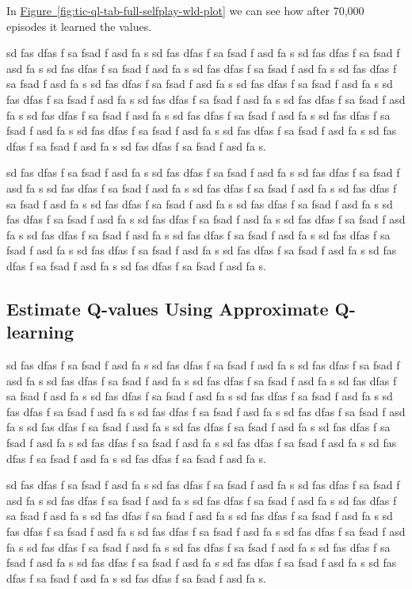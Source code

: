 \documentclass{article}
\begin{document}
In \hyperref[fig:tic-ql-tab-full-selfplay-wld-plot]
{Figure~\ref*{fig:tic-ql-tab-full-selfplay-wld-plot}} we can see how after 70,000 episodes it
learned the values.

sd fas dfas f sa fsad f asd fa s sd fas dfas f sa fsad f asd fa s sd fas dfas f sa fsad f asd fa s
sd fas dfas f sa fsad f asd fa s sd fas dfas f sa fsad f asd fa s sd fas dfas f sa fsad f asd fa s
sd fas dfas f sa fsad f asd fa s sd fas dfas f sa fsad f asd fa s sd fas dfas f sa fsad f asd fa s
sd fas dfas f sa fsad f asd fa s sd fas dfas f sa fsad f asd fa s sd fas dfas f sa fsad f asd fa s
sd fas dfas f sa fsad f asd fa s sd fas dfas f sa fsad f asd fa s sd fas dfas f sa fsad f asd fa s
sd fas dfas f sa fsad f asd fa s sd fas dfas f sa fsad f asd fa s sd fas dfas f sa fsad f asd fa s.

sd fas dfas f sa fsad f asd fa s sd fas dfas f sa fsad f asd fa s sd fas dfas f sa fsad f asd fa s
sd fas dfas f sa fsad f asd fa s sd fas dfas f sa fsad f asd fa s sd fas dfas f sa fsad f asd fa s
sd fas dfas f sa fsad f asd fa s sd fas dfas f sa fsad f asd fa s sd fas dfas f sa fsad f asd fa s
sd fas dfas f sa fsad f asd fa s sd fas dfas f sa fsad f asd fa s sd fas dfas f sa fsad f asd fa s
sd fas dfas f sa fsad f asd fa s sd fas dfas f sa fsad f asd fa s sd fas dfas f sa fsad f asd fa s
sd fas dfas f sa fsad f asd fa s sd fas dfas f sa fsad f asd fa s sd fas dfas f sa fsad f asd fa s.

\subsection{Estimate Q-values Using Approximate Q-learning}

sd fas dfas f sa fsad f asd fa s sd fas dfas f sa fsad f asd fa s sd fas dfas f sa fsad f asd fa s
sd fas dfas f sa fsad f asd fa s sd fas dfas f sa fsad f asd fa s sd fas dfas f sa fsad f asd fa s
sd fas dfas f sa fsad f asd fa s sd fas dfas f sa fsad f asd fa s sd fas dfas f sa fsad f asd fa s
sd fas dfas f sa fsad f asd fa s sd fas dfas f sa fsad f asd fa s sd fas dfas f sa fsad f asd fa s
sd fas dfas f sa fsad f asd fa s sd fas dfas f sa fsad f asd fa s sd fas dfas f sa fsad f asd fa s
sd fas dfas f sa fsad f asd fa s sd fas dfas f sa fsad f asd fa s sd fas dfas f sa fsad f asd fa s.

sd fas dfas f sa fsad f asd fa s sd fas dfas f sa fsad f asd fa s sd fas dfas f sa fsad f asd fa s
sd fas dfas f sa fsad f asd fa s sd fas dfas f sa fsad f asd fa s sd fas dfas f sa fsad f asd fa s
sd fas dfas f sa fsad f asd fa s sd fas dfas f sa fsad f asd fa s sd fas dfas f sa fsad f asd fa s
sd fas dfas f sa fsad f asd fa s sd fas dfas f sa fsad f asd fa s sd fas dfas f sa fsad f asd fa s
sd fas dfas f sa fsad f asd fa s sd fas dfas f sa fsad f asd fa s sd fas dfas f sa fsad f asd fa s
sd fas dfas f sa fsad f asd fa s sd fas dfas f sa fsad f asd fa s sd fas dfas f sa fsad f asd fa s.
\end{document}
